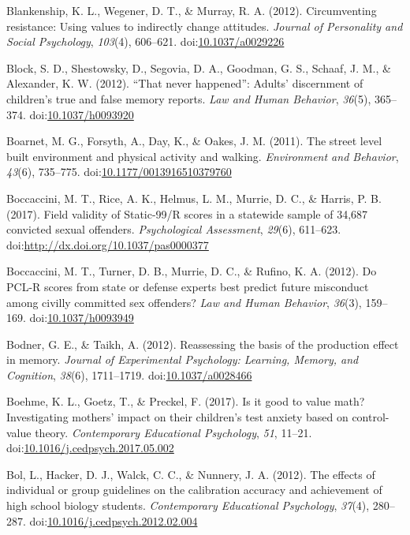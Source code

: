 \documentclass[english,man]{apa6}
\theoremstyle{definition}
\theoremstyle{definition}
\theoremstyle{definition}
\theoremstyle{remark}
\begin{document}
\hypertarget{ref-Blankenship}{}
Blankenship, K. L., Wegener, D. T., \& Murray, R. A. (2012).
Circumventing resistance: Using values to indirectly change attitudes.
\emph{Journal of Personality and Social Psychology}, \emph{103}(4),
606--621. doi:\href{https://doi.org/10.1037/a0029226}{10.1037/a0029226}

\hypertarget{ref-Block}{}
Block, S. D., Shestowsky, D., Segovia, D. A., Goodman, G. S., Schaaf, J.
M., \& Alexander, K. W. (2012). ``That never happened'': Adults'
discernment of children's true and false memory reports. \emph{Law and
Human Behavior}, \emph{36}(5), 365--374.
doi:\href{https://doi.org/10.1037/h0093920}{10.1037/h0093920}

\hypertarget{ref-Boarnet2011}{}
Boarnet, M. G., Forsyth, A., Day, K., \& Oakes, J. M. (2011). The street
level built environment and physical activity and walking.
\emph{Environment and Behavior}, \emph{43}(6), 735--775.
doi:\href{https://doi.org/10.1177/0013916510379760}{10.1177/0013916510379760}

\hypertarget{ref-Boccaccini2017}{}
Boccaccini, M. T., Rice, A. K., Helmus, L. M., Murrie, D. C., \& Harris,
P. B. (2017). Field validity of Static-99/R scores in a statewide sample
of 34,687 convicted sexual offenders. \emph{Psychological Assessment},
\emph{29}(6), 611--623.
doi:\href{https://doi.org/http://dx.doi.org/10.1037/pas0000377}{http://dx.doi.org/10.1037/pas0000377}

\hypertarget{ref-Boccaccini2011}{}
Boccaccini, M. T., Turner, D. B., Murrie, D. C., \& Rufino, K. A.
(2012). Do PCL-R scores from state or defense experts best predict
future misconduct among civilly committed sex offenders? \emph{Law and
Human Behavior}, \emph{36}(3), 159--169.
doi:\href{https://doi.org/10.1037/h0093949}{10.1037/h0093949}

\hypertarget{ref-Bodner2012}{}
Bodner, G. E., \& Taikh, A. (2012). Reassessing the basis of the
production effect in memory. \emph{Journal of Experimental Psychology:
Learning, Memory, and Cognition}, \emph{38}(6), 1711--1719.
doi:\href{https://doi.org/10.1037/a0028466}{10.1037/a0028466}

\hypertarget{ref-Boehme2017}{}
Boehme, K. L., Goetz, T., \& Preckel, F. (2017). Is it good to value
math? Investigating mothers' impact on their children's test anxiety
based on control-value theory. \emph{Contemporary Educational
Psychology}, \emph{51}, 11--21.
doi:\href{https://doi.org/10.1016/j.cedpsych.2017.05.002}{10.1016/j.cedpsych.2017.05.002}

\hypertarget{ref-Bol2012}{}
Bol, L., Hacker, D. J., Walck, C. C., \& Nunnery, J. A. (2012). The
effects of individual or group guidelines on the calibration accuracy
and achievement of high school biology students. \emph{Contemporary
Educational Psychology}, \emph{37}(4), 280--287.
doi:\href{https://doi.org/10.1016/j.cedpsych.2012.02.004}{10.1016/j.cedpsych.2012.02.004}
\end{document}
